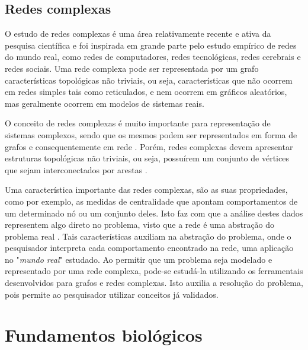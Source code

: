 \subsection{Redes complexas}

O estudo de redes complexas é uma área relativamente recente e ativa da pesquisa científica e foi inspirada em grande parte pelo estudo empírico de redes do mundo real, como redes de computadores, redes tecnológicas, redes cerebrais e redes sociais.
Uma rede complexa pode ser representada por um grafo características topológicas não triviais, ou seja, 
características que não ocorrem em redes simples tais como reticulados, e nem ocorrem em gráficos aleatórios, mas geralmente ocorrem em modelos de sistemas reais.

O conceito de redes complexas é muito importante para representação de sistemas complexos, sendo que os mesmos podem ser representados em forma de grafos e consequentemente em rede \cite{Strogatz2001}. Porém, redes complexas devem apresentar estruturas topológicas não triviais, ou seja, possuírem um conjunto de vértices que sejam interconectados por arestas \cite{Barabasi2003}.
%

Uma característica importante das redes complexas, são as suas propriedades, como por exemplo, as medidas de centralidade que apontam comportamentos de um determinado nó ou um conjunto deles. Isto faz com que a análise destes dados representem algo direto no problema, visto que a rede é uma abstração do problema real \cite{Metz2007}.
Tais características auxiliam na abstração do problema, onde o pesquisador interpreta cada comportamento encontrado na rede, uma aplicação no "\textsl{mundo real}" estudado.
%
Ao permitir que um problema seja modelado e representado por uma rede complexa, pode-se estudá-la utilizando os ferramentais desenvolvidos para grafos e redes complexas. Isto auxilia a resolução do problema, pois permite ao pesquisador utilizar conceitos já validados. 	


\section{Fundamentos biológicos}



